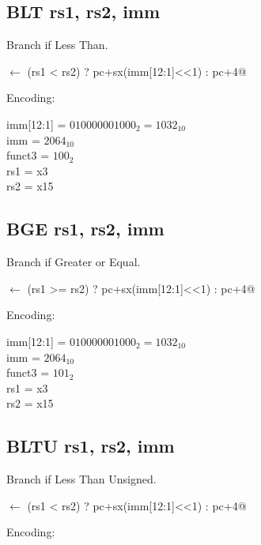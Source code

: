 \subsection{BLT rs1, rs2, imm}

Branch if Less Than.

\verb@pc@ $\leftarrow$ \verb@(rs1 < rs2) ? pc+sx(imm[12:1]<<1) : pc+4@

Encoding:


imm[12:1] = $010000001000_2 = 1032_{10}$\\
imm = $2064_{10}$\\
funct3 = $100_2$\\
rs1 = x3\\
rs2 = x15



\subsection{BGE rs1, rs2, imm}

Branch if Greater or Equal.

\verb@pc@ $\leftarrow$ \verb@(rs1 >= rs2) ? pc+sx(imm[12:1]<<1) : pc+4@

Encoding:


imm[12:1] = $010000001000_2 = 1032_{10}$\\
imm = $2064_{10}$\\
funct3 = $101_2$\\
rs1 = x3\\
rs2 = x15

\subsection{BLTU rs1, rs2, imm}

Branch if Less Than Unsigned.

\verb@pc@ $\leftarrow$ \verb@(rs1 < rs2) ? pc+sx(imm[12:1]<<1) : pc+4@

Encoding:


